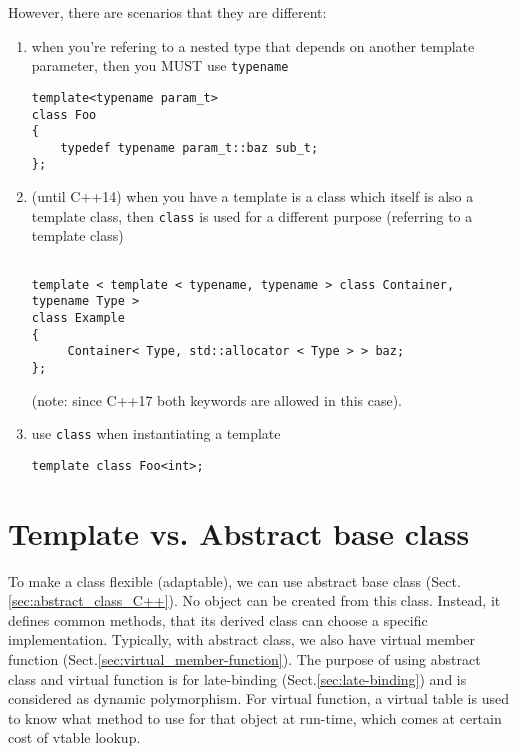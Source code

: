 However, there are scenarios that they are different:
\begin{enumerate}
  
  
  
  
  \item  when you're refering to a nested type that depends on another template parameter, then you MUST use \verb!typename!
  
\begin{verbatim}
template<typename param_t>
class Foo
{
    typedef typename param_t::baz sub_t;
};
\end{verbatim}
  
  
  \item (until C++14) when you have a template is a class which itself is also a template
  class, then \verb!class! is used for a different purpose (referring to a
  template class)
  
\begin{lstlisting}

template < template < typename, typename > class Container, typename Type >
class Example
{
     Container< Type, std::allocator < Type > > baz;
};
\end{lstlisting}

(note: since C++17 both keywords are allowed in this case).

   \item use \verb!class! when instantiating a template
   
\begin{verbatim}
template class Foo<int>;
\end{verbatim}
\end{enumerate}


\section{Template vs. Abstract base class}
\label{sec:template-vs-abstract-base-class}

To make a class flexible (adaptable), we can use abstract base class
(Sect.\ref{sec:abstract_class_C++}). No object can be created from this class.
Instead, it defines common methods, that its derived class can choose a specific
implementation. Typically, with abstract class, we also have virtual member
function (Sect.\ref{sec:virtual_member-function}). The purpose of using abstract
class and virtual function is for late-binding (Sect.\ref{sec:late-binding}) and
is considered as dynamic polymorphism. For virtual function, a virtual table is
used to know what method to use for that object at run-time, which comes at
certain cost of vtable lookup.


